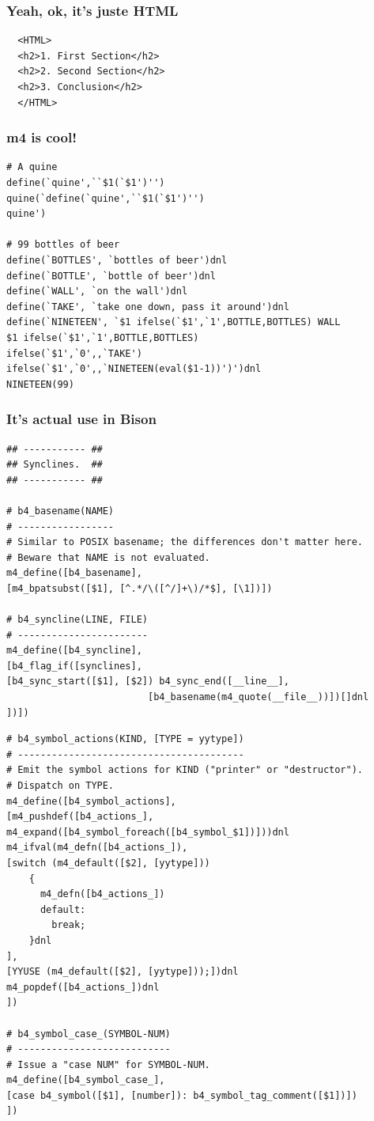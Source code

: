 \documentclass{beamer}
\begin{document}
\begin{frame}[fragile]
  \frametitle{Yeah, ok, it's juste HTML}
  \begin{verbatim}
  <HTML>
  <h2>1. First Section</h2>
  <h2>2. Second Section</h2>
  <h2>3. Conclusion</h2>
  </HTML>
  \end{verbatim}
\end{frame}

\begin{frame}[fragile,shrink=15]
  \frametitle{m4 is cool!}
\begin{verbatim}
# A quine
define(`quine',``$1(`$1')'')
quine(`define(`quine',``$1(`$1')'')
quine')

# 99 bottles of beer
define(`BOTTLES', `bottles of beer')dnl
define(`BOTTLE', `bottle of beer')dnl
define(`WALL', `on the wall')dnl
define(`TAKE', `take one down, pass it around')dnl
define(`NINETEEN', `$1 ifelse(`$1',`1',BOTTLE,BOTTLES) WALL
$1 ifelse(`$1',`1',BOTTLE,BOTTLES)
ifelse(`$1',`0',,`TAKE')
ifelse(`$1',`0',,`NINETEEN(eval($1-1))')')dnl
NINETEEN(99)
\end{verbatim}
\end{frame}

\begin{frame}[fragile,shrink=25]
  \frametitle{It's actual use in Bison}
  \begin{verbatim}
## ----------- ##
## Synclines.  ##
## ----------- ##

# b4_basename(NAME)
# -----------------
# Similar to POSIX basename; the differences don't matter here.
# Beware that NAME is not evaluated.
m4_define([b4_basename],
[m4_bpatsubst([$1], [^.*/\([^/]+\)/*$], [\1])])

# b4_syncline(LINE, FILE)
# -----------------------
m4_define([b4_syncline],
[b4_flag_if([synclines],
[b4_sync_start([$1], [$2]) b4_sync_end([__line__],
                         [b4_basename(m4_quote(__file__))])[]dnl
])])
\end{verbatim}
\end{frame}

\begin{frame}[fragile,shrink=25]
  \begin{verbatim}
# b4_symbol_actions(KIND, [TYPE = yytype])
# ----------------------------------------
# Emit the symbol actions for KIND ("printer" or "destructor").
# Dispatch on TYPE.
m4_define([b4_symbol_actions],
[m4_pushdef([b4_actions_], m4_expand([b4_symbol_foreach([b4_symbol_$1])]))dnl
m4_ifval(m4_defn([b4_actions_]),
[switch (m4_default([$2], [yytype]))
    {
      m4_defn([b4_actions_])
      default:
        break;
    }dnl
],
[YYUSE (m4_default([$2], [yytype]));])dnl
m4_popdef([b4_actions_])dnl
])

# b4_symbol_case_(SYMBOL-NUM)
# ---------------------------
# Issue a "case NUM" for SYMBOL-NUM.
m4_define([b4_symbol_case_],
[case b4_symbol([$1], [number]): b4_symbol_tag_comment([$1])])
])
\end{verbatim}
\end{frame}
\end{document}
